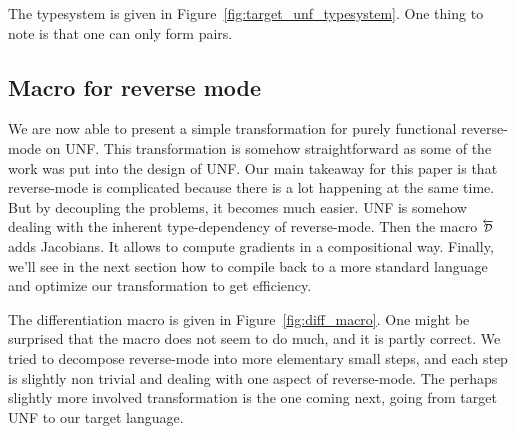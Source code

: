 

The typesystem is given in Figure~\ref{fig:target_unf_typesystem}. 
One thing to note is that one can only form pairs. 




\subsection{Macro for reverse mode}

We are now able to present a simple transformation for purely functional reverse-mode on UNF.
This transformation is somehow straightforward as some of the work was put into the design of UNF.
Our main takeaway for this paper is that reverse-mode is complicated because there is a lot happening at the same time. 
But by decoupling the problems, it becomes much easier. UNF is somehow dealing with the inherent type-dependency of reverse-mode.
Then the macro $\Dsynrevsymbol$ adds Jacobians. It allows to compute gradients in a compositional way.
Finally, we'll see in the next section how to compile back to a more standard language and optimize our transformation to get efficiency.

The differentiation macro is given in Figure~\ref{fig:diff_macro}.
One might be surprised that the macro does not seem to do much, and it is partly correct.
We tried to decompose reverse-mode into more elementary small steps, and each step is slightly non trivial and dealing with one aspect of reverse-mode.
The perhaps slightly more involved transformation is the one coming next,  going from target UNF to our target language.



